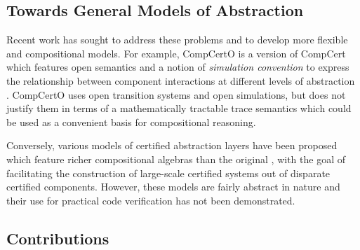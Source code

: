 \documentclass[acmsmall,review,anonymous]{acmart}\settopmatter{printfolios=true,printccs=false,printacmref=false}
\begin{document}
\subsection{Towards General Models of Abstraction}

Recent work has sought to address these problems
and to develop more flexible and compositional models.
For example,
CompCertO is a version of CompCert
which features open semantics
and a notion of \emph{simulation convention}
to express the relationship between component interactions
at different levels of abstraction
\cite{compcerto}.
CompCertO uses open transition systems and open simulations,
but does not justify them in terms of a mathematically tractable
trace semantics which could be used as a convenient basis
for compositional reasoning.

Conversely,
various models of certified abstraction layers
have been proposed
which feature richer compositional algebras
than the original
\cite{rbgs-cal,popl22},
with the goal of facilitating the construction of
large-scale certified systems out of
disparate certified components.
However,
these models are fairly abstract in nature
and their use for practical code verification
has not been demonstrated.

\subsection{Contributions}
\end{document}
